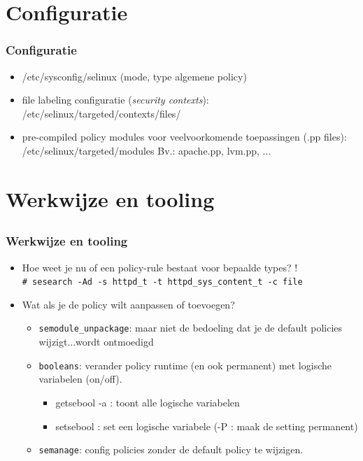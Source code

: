 \section{Configuratie}
\begin{frame}
    \frametitle{Configuratie}
\pause
\begin{itemize}
\item /etc/sysconfig/selinux (mode, type algemene policy)
\pause
\item file labeling configuratie ({\it security contexts}): /etc/selinux/targeted/contexts/files/
\pause
\item pre-compiled policy modules voor veelvoorkomende toepassingen (\*.pp files): /etc/selinux/targeted/modules
Bv.: apache.pp, lvm.pp, ...
\end{itemize}
\end{frame}

\section{Werkwijze en tooling}
\subsection{}
\begin{frame}
    \frametitle{Werkwijze en tooling}
\begin{itemize}
\pause
\item  Hoe weet je nu of een policy-rule bestaat voor bepaalde types?  ! \\
\pause
{\scriptsize
{\tt \# sesearch -Ad -s httpd\_t -t httpd\_sys\_content\_t -c file}}
\pause
\item Wat als je de policy wilt aanpassen of toevoegen? 
	\begin{itemize}
	\pause
	\item {\tt semodule\_unpackage}: maar niet de bedoeling dat je de default policies wijzigt...wordt ontmoedigd
	\pause
	\item {\tt booleans}: verander policy runtime (en ook permanent) met logische variabelen (on/off).
		\begin{itemize}
		\item getsebool -a : toont alle logische variabelen
		\item setsebool : set een logische variabele (-P : maak de setting permanent)
		\end{itemize}
	\pause
	\item {\tt semanage}: config policies zonder de default policy te wijzigen.
	\end{itemize}
\end{itemize}
\end{frame}

